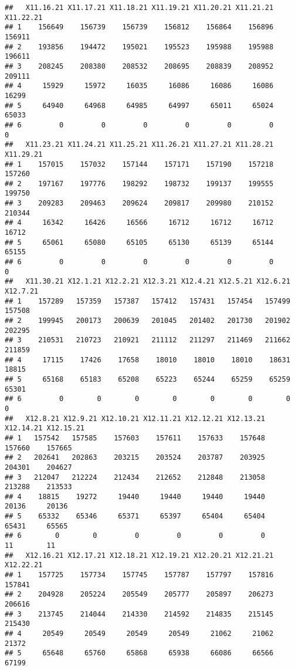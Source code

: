 \documentclass[
]{article}
\begin{document}
\begin{verbatim}
##   X11.16.21 X11.17.21 X11.18.21 X11.19.21 X11.20.21 X11.21.21 X11.22.21
## 1    156649    156739    156739    156812    156864    156896    156911
## 2    193856    194472    195021    195523    195988    195988    196611
## 3    208245    208380    208532    208695    208839    208952    209111
## 4     15929     15972     16035     16086     16086     16086     16299
## 5     64940     64968     64985     64997     65011     65024     65033
## 6         0         0         0         0         0         0         0
##   X11.23.21 X11.24.21 X11.25.21 X11.26.21 X11.27.21 X11.28.21 X11.29.21
## 1    157015    157032    157144    157171    157190    157218    157260
## 2    197167    197776    198292    198732    199137    199555    199750
## 3    209283    209463    209624    209817    209980    210152    210344
## 4     16342     16426     16566     16712     16712     16712     16712
## 5     65061     65080     65105     65130     65139     65144     65155
## 6         0         0         0         0         0         0         0
##   X11.30.21 X12.1.21 X12.2.21 X12.3.21 X12.4.21 X12.5.21 X12.6.21 X12.7.21
## 1    157289   157359   157387   157412   157431   157454   157499   157508
## 2    199945   200173   200639   201045   201402   201730   201902   202295
## 3    210531   210723   210921   211112   211297   211469   211662   211859
## 4     17115    17426    17658    18010    18010    18010    18631    18815
## 5     65168    65183    65208    65223    65244    65259    65259    65301
## 6         0        0        0        0        0        0        0        0
##   X12.8.21 X12.9.21 X12.10.21 X12.11.21 X12.12.21 X12.13.21 X12.14.21 X12.15.21
## 1   157542   157585    157603    157611    157633    157648    157660    157665
## 2   202641   202863    203215    203524    203787    203925    204301    204627
## 3   212047   212224    212434    212652    212848    213058    213288    213533
## 4    18815    19272     19440     19440     19440     19440     20136     20136
## 5    65332    65346     65371     65397     65404     65404     65431     65565
## 6        0        0         0         0         0         0        11        11
##   X12.16.21 X12.17.21 X12.18.21 X12.19.21 X12.20.21 X12.21.21 X12.22.21
## 1    157725    157734    157745    157787    157797    157816    157841
## 2    204928    205224    205549    205777    205897    206273    206616
## 3    213745    214044    214330    214592    214835    215145    215430
## 4     20549     20549     20549     20549     21062     21062     21372
## 5     65648     65760     65868     65938     66086     66566     67199

\end{verbatim}
\end{document}
